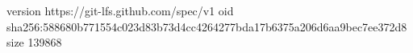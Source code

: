 version https://git-lfs.github.com/spec/v1
oid sha256:588680b771554c023d83b73d4cc4264277bda17b6375a206d6aa9bec7ee372d8
size 139868
